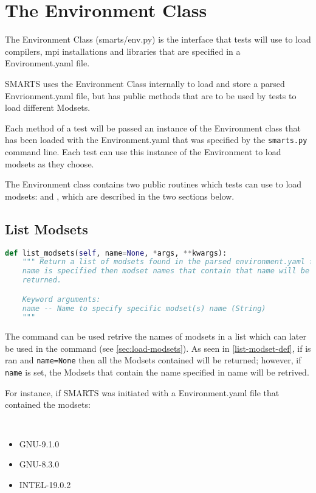 \chapter{The Environment Class}
\label{chap:environment_class}

The Environment Class (smarts/env.py) is the interface that tests will use to
load compilers, mpi installations and libraries that are specified in a
Environment.yaml file. 

SMARTS uses the Environment Class internally to load and store a parsed
Envrionment.yaml file, but has public methods that are to be used by tests to
load different Modsets.

Each \testRun method of a test will be passed an instance of the Environment
class that has been loaded with the Environment.yaml that was specified by the
{\tt smarts.py} command line. Each test can use this instance of the
Environment to load modsets as they choose.

The Environment class contains two public routines which tests can use to load
modsets: \listModsets and \loadModset, which are described in the two sections
below.

\section{List Modsets}
\label{sec:list-modsets}

\begin{lstlisting}[language=Python, 
                   caption={list\_modset Definition},
                   label=list_modset_def]
def list_modsets(self, name=None, *args, **kwargs):
    """ Return a list of modsets found in the parsed environment.yaml file, if
    name is specified then modset names that contain that name will be
    returned.

    Keyword arguments:
    name -- Name to specify specific modset(s) name (String)
    """
\end{lstlisting}

The \listModsets command can be used retrive the names of modsets in a list
which can later be used in the \loadModset command (see
\ref{sec:load-modsets}). As seen in \ref{list-modset-def}, if \listModsets is
ran and {\tt name=None} then all the Modsets contained will be returned;
however, if {\tt name} is set, the Modsets that contain the name specified in
name will be retrived.

For instance, if SMARTS was initiated with a Environment.yaml file that
contained the modsets:
{\tt
\begin{itemize}
\item GNU-9.1.0
\item GNU-8.3.0
\item INTEL-19.0.2
\end{itemize}
}

